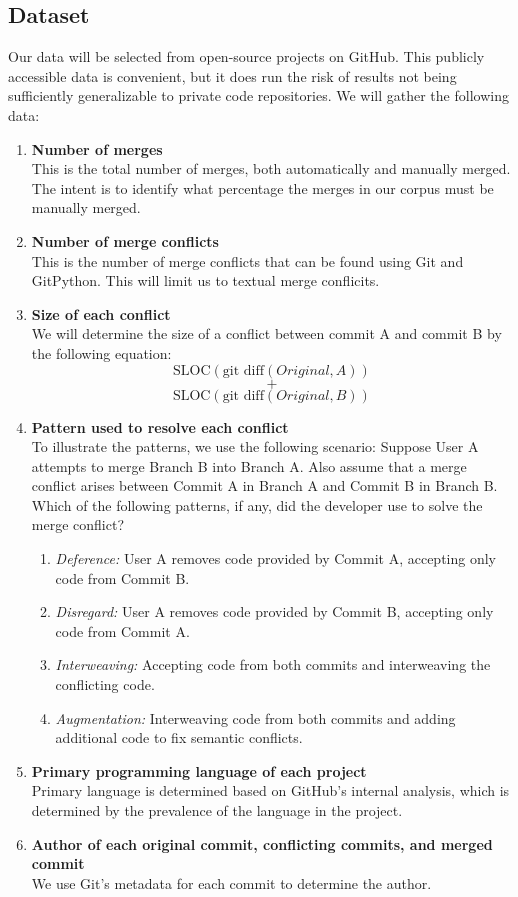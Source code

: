 \documentclass{sig-alternate-05-2015}
\begin{document}
\subsection{Dataset}
Our data will be selected from open-source projects on GitHub. This publicly accessible data is convenient, but it does run the risk of results not being sufficiently generalizable to private code repositories. We will gather the following data:
\begin{enumerate}
\item \textbf{Number of merges}\\
	This is the total number of merges, both automatically and manually merged. The intent is to identify what percentage the merges in our corpus must be manually merged.
\item \textbf{Number of merge conflicts}\\
	This is the number of merge conflicts that can be found using Git and GitPython. This will limit us to textual merge conflicits.
\item \textbf{Size of each conflict}\\
	We will determine the size of a conflict between commit A and commit B by the following equation:\\ 
	$$\text{SLOC}(\text{git diff}(Original, A))$$
	$$+$$
	$$\text{SLOC}(\text{git diff}(Original, B))$$
\item \textbf{Pattern used to resolve each conflict}\\
	To illustrate the patterns, we use the following scenario: Suppose User A attempts to merge Branch B into Branch A. Also assume that a merge conflict arises between Commit A in Branch A and Commit B in Branch B. Which of the following patterns, if any, did the developer use to solve the merge conflict?
	\begin{enumerate}
	\item\textit{Deference:} User A removes code provided by Commit A, accepting only code from Commit B.
	\item\textit{Disregard:} User A removes code provided by Commit B, accepting only code from Commit A.
	\item\textit{Interweaving:} Accepting code from both commits and interweaving the conflicting code.
	\item\textit{Augmentation:} Interweaving code from both commits and adding additional code to fix semantic conflicts.
	\end{enumerate}
\item \textbf{Primary programming language of each project}\\
Primary language is determined based on GitHub's internal analysis, which is determined by the prevalence of the language in the project.
\item \textbf{Author of each original commit, conflicting commits, and merged commit}\\
We use Git's metadata for each commit to determine the author.
\end{enumerate}
\end{document}
